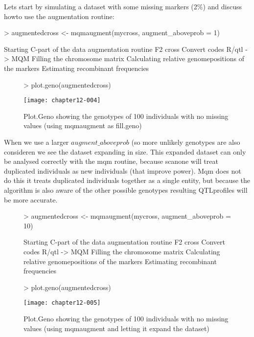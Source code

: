\documentclass[11pt]{article}
\begin{document}
Lets start by simulating a dataset with some missing markers (2\%) and discuss howto use the augmentation routine:
\begin{Schunk}
\begin{Sinput}
> augmentedcross <- mqmaugment(mycross, augment_aboveprob = 1)
\end{Sinput}
\begin{Soutput}
Starting C-part of the data augmentation routine
F2 cross
Convert codes R/qtl -> MQM
Filling the chromosome matrix
Calculating relative genomepositions of the markers
Estimating recombinant frequencies
\end{Soutput}
\end{Schunk}
\begin{figure}[h]
\begin{Schunk}
\begin{Sinput}
> plot.geno(augmentedcross)
\end{Sinput}
\end{Schunk}
\texttt{[image: chapter12-004]}
\caption{Plot.Geno showing the genotypes of 100 individuals with no missing values (using mqmaugment as fill.geno)}
\end{figure}
When we use a larger $augment\_aboveprob$ (so more unlikely genotypes are also consideren we see the dataset expanding in size.
This expanded dataset can only be analysed correctly with the mqm routine, because scanone will treat duplicated individuals
as new individuals (that improve power)\cite{Dempster77}. Mqm does not do this it treats duplicated individuals together as a single entity, but because the algorithm is also aware of the other possible genotypes resulting QTLprofiles will be more accurate\cite{jansen93}.
\\
\begin{figure}[h]
\begin{Schunk}
\begin{Sinput}
> augmentedcross <- mqmaugment(mycross, augment_aboveprob = 10)
\end{Sinput}
\begin{Soutput}
Starting C-part of the data augmentation routine
F2 cross
Convert codes R/qtl -> MQM
Filling the chromosome matrix
Calculating relative genomepositions of the markers
Estimating recombinant frequencies
\end{Soutput}
\begin{Sinput}
> plot.geno(augmentedcross)
\end{Sinput}
\end{Schunk}
\texttt{[image: chapter12-005]}
\caption{Plot.Geno showing the genotypes of 100 individuals with no missing values (using mqmaugment and letting it expand the dataset)}
\end{figure}
\clearpage
\end{document}
